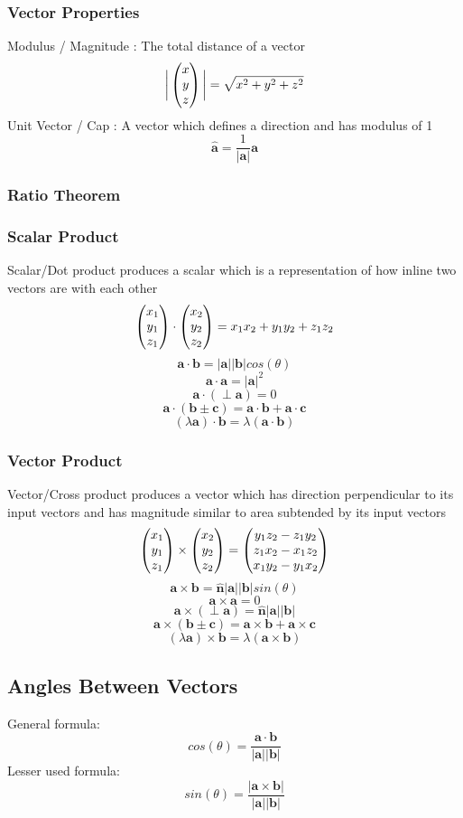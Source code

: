 \documentclass[../main]{subfiles}
\newcommand*\colvec[3][]{
    \begin{pmatrix}\ifx\relax#1\relax\else#1\\\fi#2\\#3\end{pmatrix}
}
\begin{document}
	\subsubsection{Vector Properties}
	Modulus / Magnitude : The total distance of a vector
	\[ \bigg|\colvec[x]{y}{z}\bigg| = \sqrt{x^2+y^2+z^2} \]
	Unit Vector / Cap : A vector which defines a direction and has modulus of 1
	\[ \mathbf{\hat{a}} = \frac{1}{|\mathbf{a}|}\mathbf{a} \]
	\subsubsection{Ratio Theorem}
	\subsubsection{Scalar Product}
	Scalar/Dot product produces a scalar which is a representation of how inline two vectors are with each other
	\[ \colvec[x_1]{y_1}{z_1} \cdot \colvec[x_2]{y_2}{z_2} = x_1x_2 + y_1y_2 + z_1z_2 \]
	\[ \mathbf{a} \cdot \mathbf{b} = | \mathbf{a}| | \mathbf{b}| cos(\theta) \]
	\[ \mathbf{a} \cdot \mathbf{a} = | \mathbf{a}| ^2 \]
	\[ \mathbf{a} \cdot (\perp \mathbf{a}) = 0 \]
	\[ \mathbf{a} \cdot (\mathbf{b \pm c}) = \mathbf{a} \cdot \mathbf{b} + \mathbf{a} \cdot \mathbf{c} \]
	\[ (\lambda \mathbf{a}) \cdot \mathbf{b} = \lambda (\mathbf{a} \cdot \mathbf{b}) \]
	\subsubsection{Vector Product}
	Vector/Cross product produces a vector which has direction perpendicular to its input vectors and has magnitude similar to area subtended by its input vectors
	\[ \colvec[x_1]{y_1}{z_1} \times \colvec[x_2]{y_2}{z_2} = \colvec[y_1z_2-z_1y_2]{z_1x_2-x_1z_2}{x_1y_2-y_1x_2} \]
	\[ \mathbf{a} \times \mathbf{b} = \mathbf{\hat{n}}| \mathbf{a}| | \mathbf{b}| sin(\theta) \]
	\[ \mathbf{a} \times \mathbf{a} = 0 \]
	\[ \mathbf{a} \times (\perp \mathbf{a}) = \mathbf{\hat{n}}| \mathbf{a}| | \mathbf{b}|  \]
	\[ \mathbf{a} \times (\mathbf{b \pm c}) = \mathbf{a} \times \mathbf{b} + \mathbf{a} \times \mathbf{c} \]
	\[ (\lambda \mathbf{a}) \times \mathbf{b} = \lambda (\mathbf{a} \times \mathbf{b}) \]

\subsection{Angles Between Vectors}
	General formula:
	\[ cos(\theta) = \frac{\mathbf{a} \cdot \mathbf{b}}{|\mathbf{a}||\mathbf{b}|} \]
	Lesser used formula:
	\[ sin(\theta) = \frac{|\mathbf{a} \times \mathbf{b}|}{|\mathbf{a}||\mathbf{b}|} \]
\end{document}
